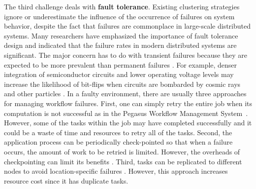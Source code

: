


The third challenge deals with \textbf{fault tolerance}. Existing clustering strategies ignore or underestimate the influence of the occurrence of failures on system behavior, despite the fact that failures are commonplace in large-scale distributed systems. Many researchers \cite{Zhang2004, Tang1990, Schroeder2006, Sahoo2004} have emphasized the importance of fault tolerance design and indicated that the failure rates in modern distributed systems are significant. The major concern has to do with transient failures because they are expected to be more prevalent than permanent failures \cite{Zhang2004}. For example, denser integration of semiconductor circuits and lower operating voltage levels may increase the likelihood of bit-flips when circuits are bombarded by cosmic rays and other particles \cite{Zhang2004}. In a faulty environment, there are usually three approaches for managing workflow failures. First, one can simply retry the entire job when its computation is not successful as in the Pegasus Workflow Management System~\cite{Deelman2004}. However, some of the tasks within the job may have completed successfully and it could be a waste of time and resources to retry all of the tasks. Second, the application process can be periodically check-pointed so that when a failure occurs, the amount of work to be retried is limited. However, the overheads of checkpointing can limit its benefits \cite{Zhang2004}. Third, tasks can be replicated to different nodes to avoid location-specific failures \cite{Zhang2009}. However, this approach increases resource cost since it has duplicate tasks. 


